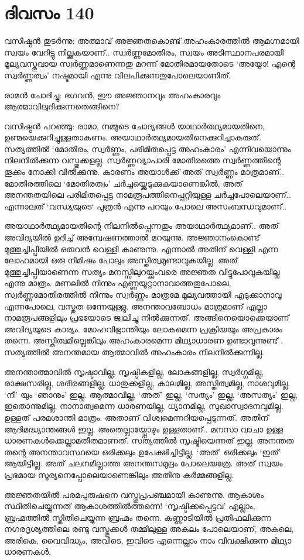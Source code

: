 \newpage
\section{ദിവസം 140}


വസിഷ്ഠൻ തുടർന്നു: അത്മാവ് അജ്ഞതകൊണ്ട് അഹംകാരത്തിൽ ആമഗ്നമായി സ്വയം വേറിട്ടു നില്ക്കുകയാണ്‌..  സ്വർണ്ണമോതിരം, സ്വയം അടിസ്ഥാനപരമായി മൂല്യവസ്തുവായ സ്വർണ്ണമാണെന്നതു മറന്ന് മോതിരമായതോടെ  ‘അയ്യോ! എന്റെ സ്വർണ്ണത്വം’ നഷ്ടമായി എന്നു വിലപിക്കുന്നതുപോലെയാണിത്.

രാമൻ ചോദിച്ചു: ഭഗവൻ, ഈ അജ്ഞാനവും അഹംകാരവും ആത്മാവിലുദിക്കുന്നതെങ്ങിനെ?

വസിഷ്ഠൻ പറഞ്ഞു: രാമാ, നമ്മുടെ ചോദ്യങ്ങൾ യാഥാർത്ഥ്യമായതിനെ, ഉണ്മയെക്കുറിച്ചുള്ളതാകണം. അയാഥാർത്ഥ്യമായതിനെക്കുറിച്ചാകരുത്. സത്യത്തിൽ ‘മോതിരം, സ്വർണ്ണം, പരിമിതപ്പെട്ട അഹംകാരം’ എന്നിവയൊന്നും നിലനിൽക്കുന്ന വസ്തുക്കളല്ല. സ്വർണ്ണവ്യാപാരി മോതിരത്തെ സ്വർണ്ണത്തിന്റെ തൂക്കം നോക്കി വിൽക്കുന്നു. കാരണം അയാൾക്ക് അത് സ്വർണ്ണം മാത്രമാണ്‌..  മോതിരത്തിലെ ‘മോതിരത്വം’ ചർച്ചയ്ക്കെടുക്കുകയാണെങ്കിൽ, അത് അനന്തതയിലെ പരിമിതപ്പെട്ട നാമരൂപത്തിനെപ്പറ്റിയുള്ള ചർച്ചപോലെയാണ്‌..  എന്നാലത് `വന്ധ്യയുടെ`  പുത്രൻ എന്നു പറയും പോലെ അസംബന്ധവുമാണ്‌.. 

അയാഥാർത്ഥ്യമായതിന്റെ നിലനിൽപ്പെന്നതും അയാഥാർത്ഥ്യമാണ്‌..  അത് അവിദ്യയിൽ ഉദിച്ച് അന്വേഷണത്താൽ മറയുന്നു. അജ്ഞാനംകൊണ്ട് മുത്തുച്ചിപ്പിയിൽ ഒരുവൻ വെള്ളി കാണുന്നു. എന്നാൽ അതിന്‌ വെള്ളി എന്ന ലോഹമായി ഒരു നിമിഷം പോലും അസ്തിത്വമുണ്ടാവുകയില്ല. അത് മുത്തുച്ചിപ്പിയാണെന്ന സത്യം മനസ്സിലുറയ്ക്കുംവരെ അജ്ഞത വിട്ടുപോവുകയില്ല എന്നു മാത്രം. മണലിൽ നിന്നും എണ്ണയൂറ്റാനാവാത്തതുപോലെ, സ്വർണ്ണമോതിരത്തിൽ നിന്നും സ്വർണ്ണം മാത്രമേ മൂല്യവത്തായി എടുക്കാനാവൂ എന്നപോലെ, വസ്തുത ഒന്നേയുള്ളു. അനന്താവബോധം മാത്രമാണ്‌ എല്ലാ നാമരൂപങ്ങളിലും പ്രഭയോടെ ജ്വലിച്ചു നിൽക്കുന്നത്. അങ്ങിനെയൊക്കെയാണ്‌ അവിദ്യയുടെ കാര്യം. മോഹവിഭ്രാന്തിയും ലോകമെന്ന പ്രക്രിയയും അപ്രകാരം തന്നെ. അസ്തിത്വമില്ലെങ്കിലും അഹംകാരമെന്ന മിഥ്യാധാരണ ഉണ്ടാവുന്നുണ്ട് . സത്യത്തിൽ അനന്തമായ ആത്മാവിൽ അഹംകാരം നിലനിൽക്കുന്നില്ല.

അനന്താത്മാവിൽ സൃഷ്ടാവില്ല, സൃഷ്ടികളില്ല, ലോകങ്ങളില്ല, സ്വർഗ്ഗമില്ല, രാക്ഷസരില്ല, ശരീരങ്ങളില്ല, ധാതുക്കളില്ല, കാലമില്ല, അസ്തിത്വമില്ല, നാശവുമില്ല. ‘നീ’ യും ‘ഞാനും’ ഇല്ല. ആത്മാവില്ല, ‘അത്’ ഇല്ല, ‘സത്യം’ ഇല്ല, ‘അസത്യം’ ഇല്ല, ഇതൊന്നുമില്ല, നാനാത്വമെന്ന ധാരണയില്ല, ധ്യാനമില്ല, സുഖാസ്വാദനവുമില്ല. ഉള്ളത് പരമശാന്തി മാത്രം. അതാണ്‌ വിശ്വമെന്നറിയപ്പെടുന്നത്. അതിന്‌ ആദിമദ്ധ്യാന്തങ്ങൾ ഇല്ല. അതെല്ലായ്പ്പോഴും ഉള്ളതാണ്‌..  മനസാ വാചാ ഉള്ള ധാരണകൾക്കെല്ലാമതീതമാണത്. സത്യത്തിൽ സൃഷ്ടിയെന്നത് ഇല്ല. അനന്തത തന്റെ അനന്താവസ്ഥയെ ഒരിക്കലും ഉപേക്ഷിച്ചിട്ടില്ല. ‘അത്’ ഒരിക്കലും ‘ഇത്’ ആയിട്ടില്ല. അത് ചലനമില്ലാത്ത അനന്തസമുദ്രം പോലെയത്രേ. അത് സ്വയം പ്രഭമായ സൂര്യനെപ്പോലെയാണെങ്കിലും അതിനു കർമ്മങ്ങളില്ല. 

അജ്ഞതയിൽ പരമപുരുഷനെ വസ്തുപ്രപഞ്ചമായി കാണുന്നു. ആകാശം സ്ഥിതിചെയ്യുന്നത് ആകാശത്തിൽത്തന്നെ! ‘സൃഷ്ടിക്കപ്പെട്ടവ’ എല്ലാം, ബ്രഹ്മത്തിൽ സ്തിതിചെയ്യുന്ന ബ്രഹ്മം തന്നെ. കണ്ണാടിയിൽ പ്രതിഫലിക്കുന്ന നഗരദൃശ്യത്തിലെ രണ്ടു വസ്തുക്കൾ തമ്മിലുള്ള അകലം പോലെയാണ്‌, അകലെ, അരികെ, വൈവിദ്ധ്യം, അവിടെ, ഇവിടെ എന്നെല്ലാം നാം വിവക്ഷിക്കുന്ന മിഥ്യാ ധാരണകൾ.

